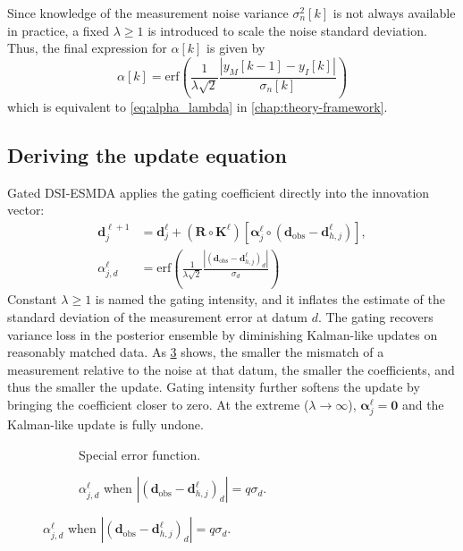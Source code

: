 Since knowledge of the measurement noise variance $\sigma^2_n[k]$ is not always available in practice,
a fixed $\lambda \geq 1$ is introduced to scale the noise standard deviation.
Thus, the final expression for $\alpha[k]$ is given by
%
\begin{equation}
    \alpha[k] 
    = \mathrm{erf}\left(
        \frac{1}{\lambda\sqrt{2}}
        \frac{|y_M[k-1] - y_I[k]|}
             {\sigma_n[k]}
        \right)
\end{equation}
%
which is equivalent to \cref{eq:alpha_lambda} in \cref{chap:theory-framework}.

\subsection{Deriving the update equation}
\label{subsec:deriving-gated-equation}
Gated DSI-ESMDA applies the gating coefficient directly into the innovation vector:
%
\begin{subequations}
    \begin{align}
        \mathbf{d}_j^{\ell+1} 
        &=
        \mathbf{d}_j^\ell + (\mathbf{R} \circ \mathbf{K}^\ell) 
        [
        \bm{\alpha}_j^\ell \circ 
        (\mathbf{d}_\text{obs} - \mathbf{d}_{h, j}^\ell)], 
    \label{eq:iteration_gated}
        \\
        \alpha_{j, d}^\ell 
        &= \mathrm{erf}
        \left(
            \frac{1}{\lambda \sqrt{2}} 
            \frac{|(\mathbf{d}_\text{obs} - \mathbf{d}_{h, j}^\ell)_d|}{\sigma_d}
        \right)
    \label{eq:alpha_lambda}
    \end{align}
\end{subequations}
%
Constant $\lambda\geq 1$ is named the gating intensity,
and it inflates the estimate of the standard deviation of the measurement error at datum $d$.
% 
The gating recovers variance loss in the posterior ensemble by diminishing Kalman-like updates on reasonably matched data.
As \cref{fig:alpha} shows, the smaller the mismatch of a measurement relative to the noise at that datum, 
the smaller the coefficients, and thus the smaller the update.
%
Gating intensity further softens the update by bringing the coefficient closer to zero.
At the extreme ($\lambda\to\infty$), 
$\bm{\alpha}_j^\ell = \mathbf{0}$ and the Kalman-like update is fully undone. 
%
\begin{figure}[htbp]
    \centering
    \caption{%
        Important functions for understanding the proposed Data-Space Inversion algorithm.
    }
    \label{fig:erf_and_alpha}
    \begin{subfigure}[b]{0.39\textwidth}
        \centering
        \caption{Special error function.}
        \label{fig:erf}
        
    \end{subfigure}
    \begin{subfigure}[b]{0.59\textwidth}
        \centering
        \caption{$\alpha_{j, d}^\ell$ when $|(\mathbf{d}_\text{obs} - \mathbf{d}_{h, j}^\ell)_d| = q\sigma_d$.}
        \label{fig:alpha}
        
    \end{subfigure}
\end{figure}

